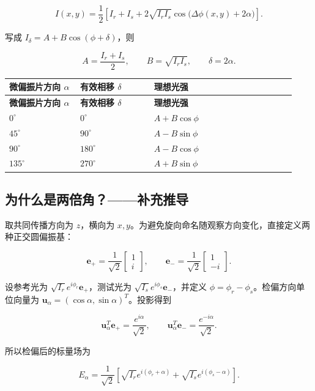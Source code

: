 \documentclass[UTF8,fontset=fandol,11pt,a4paper]{ctexart}
\begin{document}
\[
I(x,y)=\frac12\left[I_r+I_s+2\sqrt{I_rI_s}\cos\bigl(\Delta\phi(x,y)+2\alpha\bigr)\right].
\]

写成 \(I_\delta=A+B\cos(\phi+\delta)\)，则

\[
A=\frac{I_r+I_s}{2},\qquad B=\sqrt{I_rI_s},\qquad \delta=2\alpha.
\]

{\small
\begin{longtable}{>{\raggedright\arraybackslash}p{0.23\linewidth}>{\raggedright\arraybackslash}p{0.24\linewidth}>{\raggedright\arraybackslash}p{0.46\linewidth}}
\toprule
\textbf{微偏振片方向 \(\alpha\)} & \textbf{有效相移 \(\delta\)} & \textbf{理想光强} \\
\midrule
\endfirsthead
\toprule
\textbf{微偏振片方向 \(\alpha\)} & \textbf{有效相移 \(\delta\)} & \textbf{理想光强} \\
\midrule
\endhead
\(0^\circ\) & \(0^\circ\) & \(A+B\cos\phi\) \\
\(45^\circ\) & \(90^\circ\) & \(A-B\sin\phi\) \\
\(90^\circ\) & \(180^\circ\) & \(A-B\cos\phi\) \\
\(135^\circ\) & \(270^\circ\) & \(A+B\sin\phi\) \\
\bottomrule
\end{longtable}
}

\subsection{为什么是两倍角？——补充推导}

取共同传播方向为 \(z\)，横向为 \(x,y\)。为避免旋向命名随观察方向变化，直接定义两种正交圆偏振基：

\[
\mathbf e_+=\frac1{\sqrt2}\begin{bmatrix}1\\i\end{bmatrix},\qquad
\mathbf e_-=\frac1{\sqrt2}\begin{bmatrix}1\\-i\end{bmatrix}.
\]

设参考光为 \(\sqrt{I_r}e^{i\phi_r}\mathbf e_+\)，测试光为 \(\sqrt{I_s}e^{i\phi_s}\mathbf e_-\)，并定义 \(\phi=\phi_r-\phi_s\)。检偏方向单位向量为 \(\mathbf u_\alpha=(\cos\alpha,\sin\alpha)^T\)。投影得到

\[
\mathbf u_\alpha^T\mathbf e_+=\frac{e^{i\alpha}}{\sqrt2},\qquad
\mathbf u_\alpha^T\mathbf e_-=\frac{e^{-i\alpha}}{\sqrt2}.
\]

所以检偏后的标量场为

\[
E_\alpha=\frac1{\sqrt2}\left[\sqrt{I_r}e^{i(\phi_r+\alpha)}+\sqrt{I_s}e^{i(\phi_s-\alpha)}\right].
\]
\end{document}
